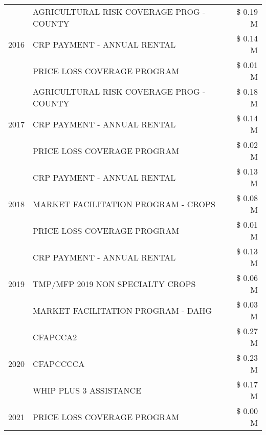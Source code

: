 \begin{tabular}{llr}
\cline{1-3}
\multirow[t]{3}{*}{2016} & AGRICULTURAL RISK COVERAGE PROG - COUNTY      & \$ 0.19 M \\
 & CRP PAYMENT - ANNUAL RENTAL                   & \$ 0.14 M \\
 & PRICE LOSS COVERAGE PROGRAM                   & \$ 0.01 M \\
\cline{1-3}
\multirow[t]{3}{*}{2017} & AGRICULTURAL RISK COVERAGE PROG - COUNTY & \$ 0.18 M \\
 & CRP PAYMENT - ANNUAL RENTAL & \$ 0.14 M \\
 & PRICE LOSS COVERAGE PROGRAM & \$ 0.02 M \\
\cline{1-3}
\multirow[t]{3}{*}{2018} & CRP PAYMENT - ANNUAL RENTAL & \$ 0.13 M \\
 & MARKET FACILITATION PROGRAM - CROPS & \$ 0.08 M \\
 & PRICE LOSS COVERAGE PROGRAM & \$ 0.01 M \\
\cline{1-3}
\multirow[t]{3}{*}{2019} & CRP PAYMENT - ANNUAL RENTAL & \$ 0.13 M \\
 & TMP/MFP 2019 NON SPECIALTY CROPS & \$ 0.06 M \\
 & MARKET FACILITATION PROGRAM - DAHG & \$ 0.03 M \\
\cline{1-3}
\multirow[t]{3}{*}{2020} & CFAPCCA2 & \$ 0.27 M \\
 & CFAPCCCCA & \$ 0.23 M \\
 & WHIP PLUS 3 ASSISTANCE & \$ 0.17 M \\
\cline{1-3}
2021 & PRICE LOSS COVERAGE PROGRAM & \$ 0.00 M \\
\cline{1-3}
\bottomrule
\end{tabular}

